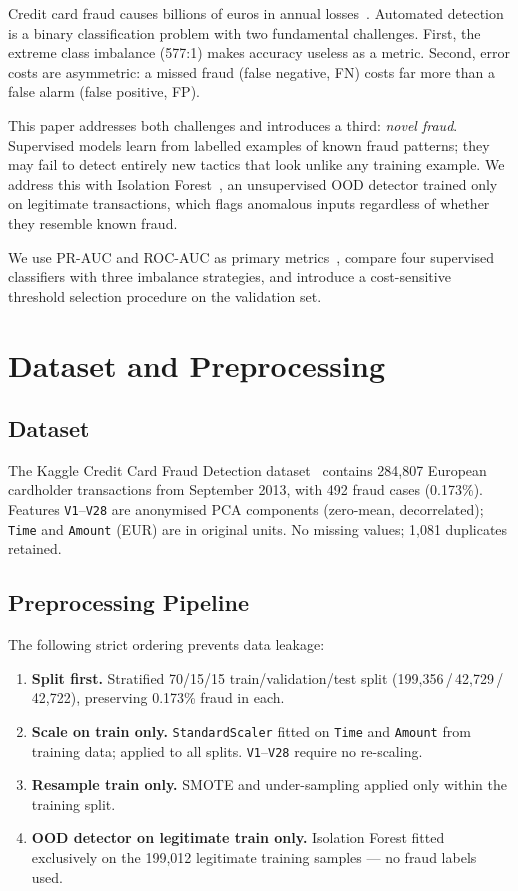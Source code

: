 \documentclass[conference]{IEEEtran}
\begin{document}
Credit card fraud causes billions of euros in annual losses~\cite{nilson2023}.
Automated detection is a binary classification problem with two fundamental
challenges. First, the extreme class imbalance (577:1) makes accuracy useless
as a metric. Second, error costs are asymmetric: a missed fraud (false negative,
FN) costs far more than a false alarm (false positive, FP).

This paper addresses both challenges and introduces a third: \textit{novel fraud}.
Supervised models learn from labelled examples of known fraud patterns; they may
fail to detect entirely new tactics that look unlike any training example.
We address this with Isolation Forest~\cite{liu2008isolation}, an unsupervised
OOD detector trained only on legitimate transactions, which flags anomalous
inputs regardless of whether they resemble known fraud.

We use PR-AUC and ROC-AUC as primary metrics~\cite{davis2006relationship},
compare four supervised classifiers with three imbalance strategies, and
introduce a cost-sensitive threshold selection procedure on the validation set.

\section{Dataset and Preprocessing}

\subsection{Dataset}

The Kaggle Credit Card Fraud Detection dataset~\cite{kaggle_ccfd} contains
284,807 European cardholder transactions from September 2013, with 492 fraud
cases (0.173\%). Features \texttt{V1}--\texttt{V28} are anonymised PCA
components (zero-mean, decorrelated); \texttt{Time} and \texttt{Amount} (EUR)
are in original units. No missing values; 1,081 duplicates retained.

\subsection{Preprocessing Pipeline}

The following strict ordering prevents data leakage:
\begin{enumerate}
  \item \textbf{Split first.} Stratified 70/15/15 train/validation/test split
        (199,356\,/\,42,729\,/\,42,722), preserving 0.173\% fraud in each.
  \item \textbf{Scale on train only.} \texttt{StandardScaler} fitted on
        \texttt{Time} and \texttt{Amount} from training data; applied to all
        splits. \texttt{V1}--\texttt{V28} require no re-scaling.
  \item \textbf{Resample train only.} SMOTE and under-sampling applied only
        within the training split.
  \item \textbf{OOD detector on legitimate train only.} Isolation Forest fitted
        exclusively on the 199,012 legitimate training samples --- no fraud
        labels used.
\end{enumerate}
\end{document}
